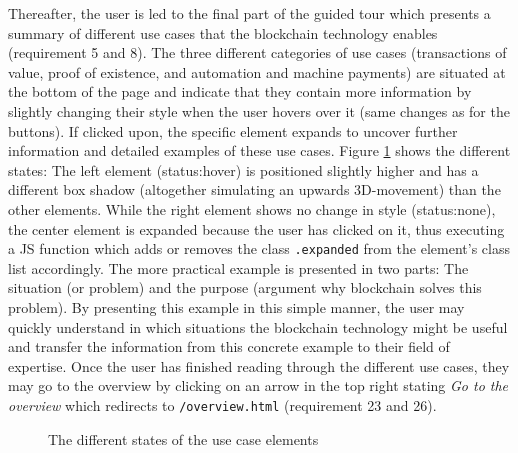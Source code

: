 Thereafter, the user is led to the final part of the guided tour which presents a summary of different use cases that the blockchain technology enables (requirement 5 and 8). The three different categories of use cases (transactions of value, proof of existence, and automation and machine payments) are situated at the bottom of the page and indicate that they contain more information by slightly changing their style when the user hovers over it (same changes as for the buttons). If clicked upon, the specific element expands to uncover further information and detailed examples of these use cases. Figure \ref{fig:AnimUC} shows the different states: The left element (status:hover) is positioned slightly higher and has a different box shadow (altogether simulating an upwards 3D-movement) than the other elements. While the right element shows no change in style (status:none), the center element is expanded because the user has clicked on it, thus executing a \ac{JS} function which adds or removes the class \texttt{.expanded} from the element's class list accordingly. The more practical example is presented in two parts: The situation (or problem) and the purpose (argument why blockchain solves this problem). By presenting this example in this simple manner, the user may quickly understand in which situations the blockchain technology might be useful and transfer the information from this concrete example to their field of expertise. Once the user has finished reading through the different use cases, they may go to the overview by clicking on an arrow in the top right stating \textit{Go to the overview} which redirects to \texttt{/overview.html} (requirement 23 and 26). 

\begin{figure}
    \centering
    
    \caption{The different states of the use case elements}
    \label{fig:AnimUC}
\end{figure}


